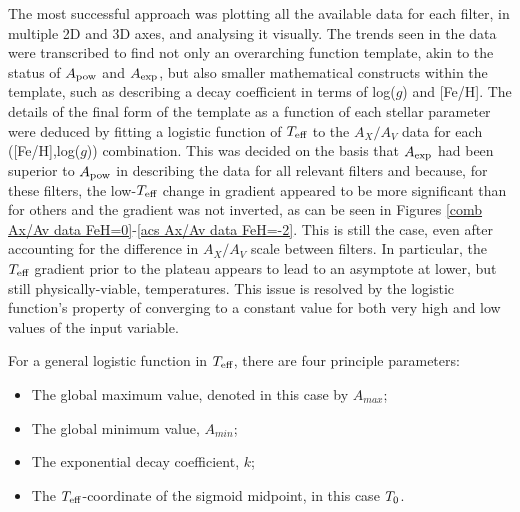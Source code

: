 \documentclass[12pt, a4paper]{report}
\begin{document}

The most successful approach was plotting all the available data for each filter, in multiple 2D and 3D axes, and analysing it visually. The trends seen in the data were transcribed to find not only an overarching function template, akin to the status of $A_{\textnormal{pow}}$ and $A_{\textnormal{exp}}$, but also smaller mathematical constructs within the template, such as describing a decay coefficient in terms of log($g$) and [Fe/H]. The details of the final form of the template as a function of each stellar parameter were deduced by fitting a logistic function of $T_{\textnormal{eff}}$ to the $A_{X}/A_{V}$ data for each ([Fe/H],log($g$)) combination. This was decided on the basis that $A_{\textnormal{exp}}$ had been superior to $A_{\textnormal{pow}}$ in describing the data for all relevant filters and because, for these filters, the low-$T_{\textnormal{eff}}$ change in gradient appeared to be more significant than for others and the gradient was not inverted, as can be seen in Figures \ref{comb Ax/Av data FeH=0}-\ref{acs Ax/Av data FeH=-2}. This is still the case, even after accounting for the difference in $A_{X}/A_{V}$ scale between filters. In particular, the $T_{\textnormal{eff}}$ gradient prior to the plateau appears to lead to an asymptote at lower, but still physically-viable, temperatures. This issue is resolved by the logistic function's property of converging to a constant value for both very high and low values of the input variable. 

For a general logistic function in $T_{\textnormal{eff}}$, there are four principle parameters:
\begin{itemize}
\item The global maximum value, denoted in this case by $A_{max}$;
\item The global minimum value, $A_{min}$;
\item The exponential decay coefficient, $k$;
\item The $T_{\textnormal{eff}}$-coordinate of the sigmoid midpoint, in this case $T_{\textnormal{0}}$.
\end{itemize}
\end{document}

